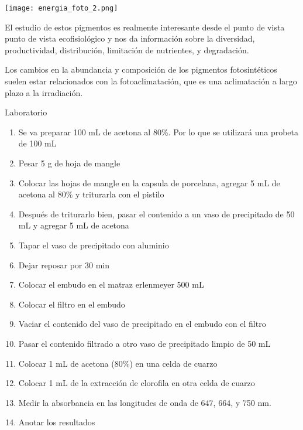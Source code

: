 \documentclass[12pt, aspectratio=169]{beamer}
\begin{document}
	\begin{frame}
		\texttt{[image: energia\_foto\_2.png]}
		\centering
	\end{frame}

	\begin{frame}
		El estudio de estos pigmentos es realmente interesante desde el punto de vista punto de vista ecofisiológico y nos da información sobre la diversidad, productividad, distribución, limitación de nutrientes, y degradación.
		
		Los cambios en la abundancia y composición de los pigmentos fotosintéticos suelen estar relacionados con la fotoaclimatación, que es una aclimatación a largo plazo a la irradiación.
		
	\end{frame}

	\begin{frame}{Laboratorio}
		
		\begin{enumerate}
			\item Se va preparar 100 mL de acetona al 80\%. Por lo que se utilizar\'a una probeta de 100 mL
			\item Pesar 5 g de hoja de mangle
			\item Colocar las hojas de mangle en la capsula de porcelana, agregar 5 mL de acetona al 80\% y triturarla con el pistilo
			\item Después de triturarlo bien, pasar el contenido a un vaso de precipitado de 50 mL y agregar 5 mL de acetona
			\item Tapar el vaso de precipitado con aluminio
			\item Dejar reposar por 30 min
			\item Colocar el embudo en el matraz erlenmeyer 500 mL 
			\item Colocar el filtro en el embudo
			\item Vaciar el contenido del vaso de precipitado en el embudo con el filtro 
			\item Pasar el contenido filtrado a otro vaso de precipitado limpio de 50 mL 
			\item Colocar 1 mL de acetona (80\%) en una celda de cuarzo 
			\item Colocar 1 mL de la extracci\'on de clorofila en otra celda de cuarzo
			\item Medir la absorbancia en las longitudes de onda de 647, 664, y 750 nm.
			\item Anotar los resultados 
		\end{enumerate}
				
	\end{frame}
\end{document}
